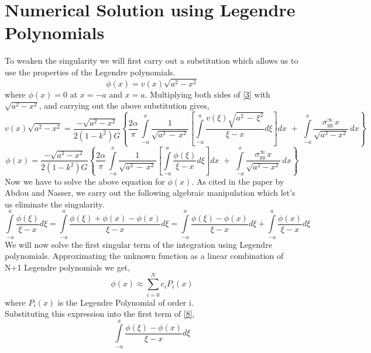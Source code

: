 \documentclass[1p,preprint,12pt]{elsarticle1}
\begin{document}
\section{Numerical Solution using Legendre Polynomials}
To weaken the singularity we will first carry out a substitution which allows us to use the properties of the Legendre polynomials.
\begin{equation}\label{5}
\phi(x) = v(x)\sqrt{a^2-x^2}
\end{equation}
where $\phi(x)=0$ at $x=-a$ and $x=a$. Multiplying both sides of \ref{3} with $\sqrt{a^2-x^2}$, and carrying out the above substitution gives,
\begin{equation}\label{3}
			v(x)\sqrt{a^2-x^2} = \frac{-\sqrt{a^2-x^2}}{2(1-k^2)G}\left \{\frac{2\alpha}{\pi}\,\int\limits_{-a}^x \frac{1}{\sqrt{a^2\,-\,x^2}}\left[\int\limits_{-a}^a \frac{v(\xi)\sqrt{a^2\,-\,\xi^2}}{\xi-x}d\xi\right]dx \,\,+\,\, \int\limits_{-a}^x \frac{\sigma^{\infty}_{yy}\,x}{\sqrt{a^2-x^2}}\,dx\right\}
\end{equation}
\begin{equation}\label{3}
			\phi(x) = \frac{-\sqrt{a^2-x^2}}{2(1-k^2)G}\left \{\frac{2\alpha}{\pi}\,\int\limits_{-a}^x \frac{1}{\sqrt{a^2\,-\,x^2}}\left[\int\limits_{-a}^a \frac{\phi(\xi)}{\xi-x}d\xi\right]dx \,\,+\,\, \int\limits_{-a}^x \frac{\sigma^{\infty}_{yy}\,x}{\sqrt{a^2-x^2}}\,dx\right\}
\end{equation}
Now we have to solve the above equation for $\phi(x)$. As cited in the paper by Abdou and Nasser, we carry out the following algebraic manipulation which let's us eliminate the singularity.
\begin{equation}
	\int\limits_{-a}^{a}\frac{\phi(\xi)}{\xi-x}d\xi = \int\limits_{-a}^{a}\frac{\phi(\xi) + \phi(x) - \phi(x)}{\xi-x}d\xi = \int\limits_{-a}^{a}\frac{\phi(\xi)-\phi(x)}{\xi-x}d\xi + \int\limits_{-a}^{a}\frac{\phi(x)}{\xi-x}d\xi
\end{equation}
We will now solve the first singular term of the integration using Legendre polynomials. Approximating the unknown function as a linear combination of N+1 Legendre polynomials we get,
\begin{equation}
\phi(x) \approx \sum\limits_{i=0}^{N}c_iP_i(x)
\end{equation}
where $P_i(x)$ is the Legendre Polynomial of order i.\\
Substituting this expression into the first term of \ref{8},
\begin{equation}
\int\limits_{-a}^{a}\frac{\phi(\xi)-\phi(x)}{\xi-x}d\xi
\end{equation}
\end{document}

